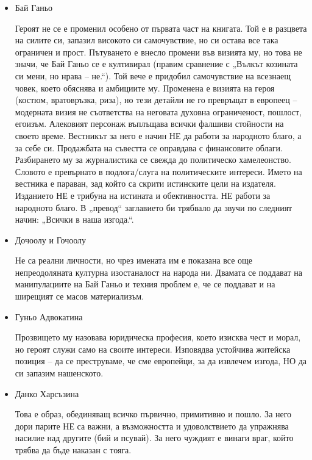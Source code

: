 \documentclass[12pt,a4paper]{article}
\begin{document}
\begin{itemize}
    \item Бай Ганьо
     
    \hspace*{0.5cm} Героят не се е променил особено от първата част на книгата. Той е в разцвета на силите си, запазил високото си самочувствие, но си остава все така ограничен и прост. Пътуването е внесло промени във визията му, но това не значи, че Бай Ганьо се е култивирал (правим сравнение с „Вълкът козината си мени, но нрава – не.“). Той вече е придобил самочувствие на всезнаещ човек, което обяснява и амбициите му. Променена е визията на героя (костюм, вратовръзка, риза), но тези детайли не го превръщат в европеец – модерната визия не съответства на неговата духовна ограниченост, пошлост, егоизъм. Алековият персонаж въплъщава всички фалшиви стойности на своето време. Вестникът за него е начин НЕ да работи за народното благо, а за себе си. Продажбата на съвестта се оправдава с финансовите облаги. Разбирането му за журналистика се свежда до политическо хамелеонство. Словото е превърнато в подлога/слуга на политическите интереси. Името на вестника е параван, зад който са скрити истинските цели на издателя. Изданието НЕ е трибуна на истината и обективността. НЕ работи за народното благо. В „превод“ заглавието би трябвало да звучи по следният начин: „Всички в наша изгода.“.
    \vspace{-0.2cm}
    \item Дочоолу и Гочоолу
     
    \hspace*{0.5cm} Не са реални личности, но чрез имената им е показана все още непреодоляната културна изостаналост на народа ни. Двамата се поддават на манипулациите на Бай Ганьо и техния проблем е, че се поддават и на ширещият се масов материализъм.
    \vspace{-0.2cm}
    \item Гуньо Адвокатина
     
    \hspace*{0.5cm} Прозвището му назовава юридическа професия, което изисква чест и морал, но героят служи само на своите интереси. Изповядва устойчива житейска позиция – да се преструваме, че сме европейци, за да извлечем изгода, НО да си запазим нашенското.
    \vspace{-0.2cm}
    \item Данко Харсъзина
     
    \hspace*{0.5cm} Това е образ, обединяващ всичко първично, примитивно и пошло. За него дори парите НЕ са важни, а възможността и удоволствието да упражнява насилие над другите (бий и псувай). За него чуждият е винаги враг, който трябва да бъде наказан с тояга. 
\end{itemize}
\vspace{0.1cm}
 
\end{document}
